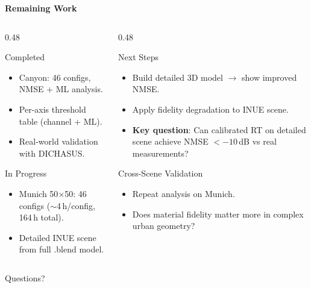 \documentclass[
    aspectratio=169
]{beamer}
\begin{document}
\begin{frame}{\textbf{Remaining Work}}
\begin{columns}[T]
\begin{column}{0.48\textwidth}
\begin{block}{Completed}
\begin{itemize}
    \item[\checkmark] Canyon: 46 configs, NMSE + ML analysis.
    \item[\checkmark] Per-axis threshold table (channel + ML).
    \item[\checkmark] Real-world validation with DICHASUS.
\end{itemize}
\end{block}
\begin{block}{In Progress}
\begin{itemize}
    \item Munich 50$\times$50: 46 configs ($\sim$4\,h/config, 164\,h total).
    \item Detailed INUE scene from full .blend model.
\end{itemize}
\end{block}
\end{column}

\begin{column}{0.48\textwidth}
\begin{block}{Next Steps}
\begin{itemize}
    \item Build detailed 3D model $\rightarrow$ show improved NMSE.
    \item Apply fidelity degradation to INUE scene.
    \item \textbf{Key question}: Can calibrated RT on detailed scene achieve NMSE $< -10$\,dB vs real measurements?
\end{itemize}
\end{block}
\begin{block}{Cross-Scene Validation}
\begin{itemize}
    \item Repeat analysis on Munich.
    \item Does material fidelity matter more in complex urban geometry?
\end{itemize}
\end{block}
\end{column}
\end{columns}
\end{frame}


\begin{frame}
\begin{center}
    \Large Questions?
\end{center}
\end{frame}
\end{document}
